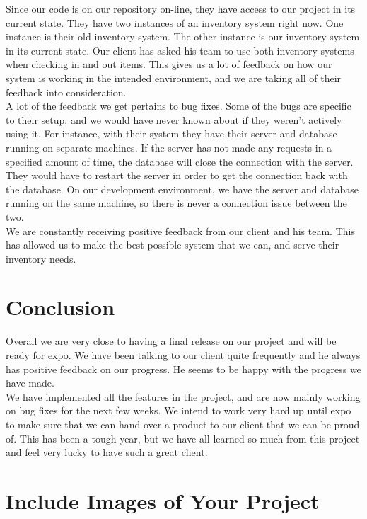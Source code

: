 \documentclass[10pt, onecolumn, twoside, peerreview]{IEEEtran}
\begin{document}
Since our code is on our repository on-line, they have access to our project in
its current state. They have two instances of an inventory system right now.
One instance is their old inventory system. The other instance is our inventory
system in its current state. Our client has asked his team to use both
inventory systems when checking in and out items. This gives us a lot of
feedback on how our system is working in the intended environment, and we are
taking all of their feedback into consideration.\\

A lot of the feedback we get pertains to bug fixes. Some of the bugs are
specific to their setup, and we would have never known about if they weren't
actively using it. For instance, with their system they have their server and
database running on separate machines. If the server has not made any requests
in a specified amount of time, the database will close the connection with the
server. They would have to restart the server in order to get the connection
back with the database. On our development environment, we have the server and
database running on the same machine, so there is never a connection issue
between the two.\\

We are constantly receiving positive feedback from our client and his team.
This has allowed us to make the best possible system that we can, and
serve their inventory needs.

\section{Conclusion}

Overall we are very close to having a final release on our
project and will be ready for expo. We have been talking to our client quite
frequently and he always has positive feedback on our progress. He seems to be
happy with the progress we have made.\\

We have implemented all the features in the project, and are now mainly working
on bug fixes for the next few weeks. We intend to work very hard up until expo
to make sure that we can hand over a product to our client that we can be proud
of. This has been a tough year, but we have all learned so much from this
project and feel very lucky to have such a great client.

\clearpage


\section{Include Images of Your Project}
\end{document}
